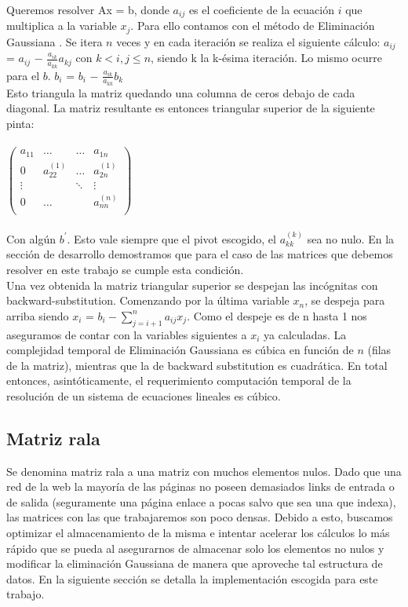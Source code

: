 Queremos resolver Ax = b, donde $a_{ij}$ es el coeficiente de la ecuación $i$ que multiplica a la variable $x_{j}$. Para ello contamos con el método de Eliminación Gaussiana \cite{burden}. 
Se itera $n$ veces y en cada iteración se realiza el siguiente cálculo: 
$a_{ij}$ = $a_{ij}$ $-$ $\frac{a_{ik}}{a_{kk}} a_{kj}$  con $k < i,j \leq n$, siendo k la k-ésima iteración.
Lo mismo ocurre para el $b$. $b_{i}$ = $b_{i}$ $-$ $\frac{a_{ik}}{a_{kk}} b_{k}$ \\
Esto triangula la matriz quedando una columna de ceros debajo de cada diagonal. La matriz resultante es entonces triangular superior de la siguiente pinta: \\ \\

$\begin{pmatrix}
a_{11} & \dots & \dots & a_{1n} \\
0 & a_{22}^{(1)} & \dots & a_{2n}^{(1)} \\
\vdots &  & \ddots  & \vdots \\
0 & \dots & & a_{nn}^{(n)}       \\
\end{pmatrix}$ \\ \\

Con algún $b^{'}$. Esto vale siempre que el pivot escogido, el $a_{kk}^{(k)}$ sea no nulo. En la sección de desarrollo demostramos que para el caso de las matrices que debemos resolver en este trabajo se cumple esta condición.\\

Una vez obtenida la matriz triangular superior se despejan las incógnitas con backward-substitution. Comenzando por la última variable $x_{n}$, se despeja para arriba siendo $x_{i}$ = $b_{i} - \sum_{j=i+1}^{n} a_{ij}x_{j}$. Como el despeje es de n hasta 1 nos aseguramos de contar con la variables siguientes a $x_{i}$ ya calculadas. 
La complejidad temporal de Eliminación Gaussiana es cúbica en función de $n$ (filas de la matriz), mientras que la de backward substitution es cuadrática. En total entonces, asintóticamente, el requerimiento computación temporal de la resolución de un sistema de ecuaciones lineales es cúbico.\\

\subsection{Matriz rala}

Se denomina matriz rala a una matriz con muchos elementos nulos. Dado que una red de la web la mayoría de las páginas no poseen demasiados links de entrada o de salida (seguramente una página enlace a pocas salvo que sea una que indexa), las matrices con las que trabajaremos son poco densas. Debido a esto, buscamos optimizar el almacenamiento de la misma e intentar acelerar los cálculos lo más rápido que se pueda al asegurarnos de almacenar solo los elementos no nulos y modificar la eliminación Gaussiana de manera que aproveche tal estructura de datos. 
En la siguiente sección se detalla la implementación escogida para este trabajo.\\ \\


